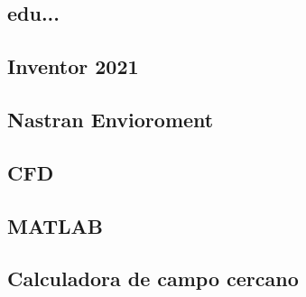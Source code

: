 \subsection{edu...}
\subsection{Inventor 2021}

\subsection{Nastran Envioroment}

\subsection{CFD}
\subsection{MATLAB}
\subsection{Calculadora de campo cercano}